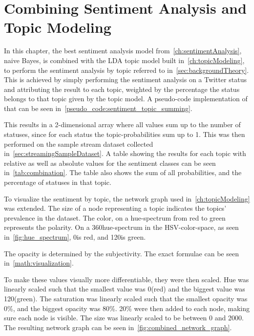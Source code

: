 \chapter{Combining Sentiment Analysis and Topic Modeling}
\label{ch:combiningSentimentAnalysisAndTopicModeling}


In this chapter, the best sentiment analysis model from~\cref{ch:sentimentAnalysis}, naive Bayes,
is combined with the LDA topic model built in~\cref{ch:topicModeling},
to perform the sentiment analysis by topic referred to in~\cref{sec:backgroundTheory}.
\\
This is achieved by simply performing the sentiment analysis on a Twitter status and attributing the result to each topic,
weighted by the percentage the status belongs to that topic given by the topic model.
A pseudo-code implementation of that can be seen in~\cref{pseudo_code:sentiment_topic_summing}.

This results in a 2-dimensional array where all values sum up to the number of statuses,
since for each status the topic-probabilities sum up to 1.
This was then performed on the sample stream dataset collected in~\cref{sec:streamingSampleDataset}.
A table showing the results for each topic with relative as well as absolute values for the sentiment classes can be seen in~\cref{tab:combination}.
The table also shows the sum of all probabilities, and the percentage of statuses in that topic.

To visualize the sentiment by topic,
the network graph used in~\cref{ch:topicModeling} was extended.
The size of a node representing a topic indicates the topics' prevalence in the dataset.
The color, on a hue-spectrum from red to green represents the polarity.
On a 360\degree hue-spectrum in the HSV-color-space, as seen in~\cref{fig:hue_spectrum}, 0\degree is red, and 120\degree is green.

The opacity is determined by the subjectivity.
The exact formulae can be seen in~\cref{math:visualization}.

\begin{absolutelynopagebreak}
    To make these values visually more differentiable, they were then scaled.
    Hue was linearly scaled such that the smallest value was 0\degree (red) and the biggest value was 120\degree (green).
    The saturation was linearly scaled such that the smallest opacity was 0\%,
    and the biggest opacity was 80\%.
    20\% were then added to each node, making sure each node is visible.
    The size was linearly scaled to be between 0 and 2000.
    The resulting network graph can be seen in~\cref{fig:combined_network_graph}.
\end{absolutelynopagebreak}

